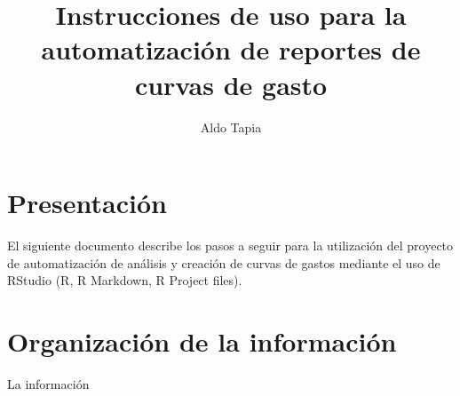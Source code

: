 \documentclass[10pt]{article}
\title{Instrucciones de uso para la automatización de reportes de curvas de gasto}
\author{Aldo Tapia}
\begin{document}
\maketitle

\section{Presentación\\}

El siguiente documento describe los pasos a seguir para la utilización del proyecto de automatización de análisis y creación de curvas de gastos mediante el uso de RStudio (R, R Markdown, R Project files).

\section{Organización de la información\\}

La información
\end{document}
